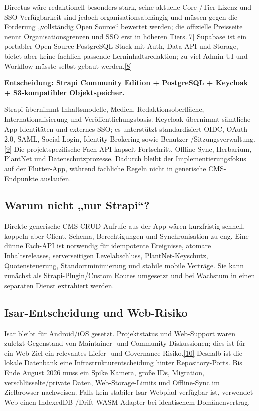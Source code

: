 \documentclass[10pt,a4paper,oneside]{article}
\newcommand{\Src}[1]{\hyperlink{src:#1}{\textcolor{Forest}{[#1]}}}
\begin{document}
Directus wäre redaktionell besonders stark, seine aktuelle Core-/Tier-Lizenz und SSO-Verfügbarkeit sind jedoch organisationsabhängig und müssen gegen die Forderung „vollständig Open Source“ bewertet werden; die offizielle Preisseite nennt Organisationsgrenzen und SSO erst in höheren Tiers.\Src{7} Supabase ist ein portabler Open-Source-PostgreSQL-Stack mit Auth, Data API und Storage, bietet aber keine fachlich passende Lerninhaltsredaktion; zu viel Admin-UI und Workflow müsste selbst gebaut werden.\Src{8}

\begin{decisionbox}[title={\textbf{ADR-BE-001 -- Empfohlenes Backend}}]
\textbf{Entscheidung: Strapi Community Edition + PostgreSQL + Keycloak + S3-kompatibler Objektspeicher.}

Strapi übernimmt Inhaltsmodelle, Medien, Redaktionsoberfläche, Internationalisierung und Veröffentlichungsbasis. Keycloak übernimmt sämtliche App-Identitäten und externes SSO; es unterstützt standardisiert OIDC, OAuth 2.0, SAML, Social Login, Identity Brokering sowie Benutzer-/Sitzungsverwaltung.\Src{9} Die projektspezifische Fach-API kapselt Fortschritt, Offline-Sync, Herbarium, PlantNet und Datenschutzprozesse. Dadurch bleibt der Implementierungsfokus auf der Flutter-App, während fachliche Regeln nicht in generische CMS-Endpunkte auslaufen.
\end{decisionbox}

\subsection{Warum nicht „nur Strapi“?}

Direkte generische CMS-CRUD-Aufrufe aus der App wären kurzfristig schnell, koppeln aber Client, Schema, Berechtigungen und Synchronisation zu eng. Eine dünne Fach-API ist notwendig für idempotente Ereignisse, atomare Inhaltsreleases, serverseitigen Levelabschluss, PlantNet-Keyschutz, Quotensteuerung, Standortminimierung und stabile mobile Verträge. Sie kann zunächst als Strapi-Plugin/Custom Routes umgesetzt und bei Wachstum in einen separaten Dienst extrahiert werden.

\subsection{Isar-Entscheidung und Web-Risiko}

Isar bleibt für Android/iOS gesetzt. Projektstatus und Web-Support waren zuletzt Gegenstand von Maintainer- und Community-Diskussionen; dies ist für ein Web-Ziel ein relevantes Liefer- und Governance-Risiko.\Src{10} Deshalb ist die lokale Datenbank eine Infrastrukturentscheidung hinter Repository-Ports. Bis Ende August 2026 muss ein Spike Kamera, große IDs, Migration, verschlüsselte/private Daten, Web-Storage-Limits und Offline-Sync im Zielbrowser nachweisen. Falls kein stabiler Isar-Webpfad verfügbar ist, verwendet Web einen IndexedDB-/Drift-WASM-Adapter bei identischem Domänenvertrag.
\end{document}
